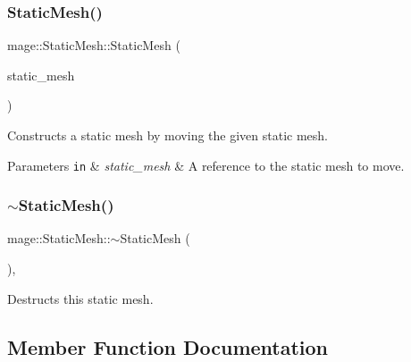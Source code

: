 \subsubsection{\texorpdfstring{Static\+Mesh()}{StaticMesh()}\hspace{0.1cm}{\footnotesize\ttfamily [4/4]}}
{\footnotesize\ttfamily mage\+::\+Static\+Mesh\+::\+Static\+Mesh (\begin{DoxyParamCaption}\item[{\hyperlink{classmage_1_1_static_mesh}{Static\+Mesh} \&\&}]{static\+\_\+mesh }\end{DoxyParamCaption})\hspace{0.3cm}{\ttfamily [default]}}

Constructs a static mesh by moving the given static mesh.


\begin{DoxyParams}[1]{Parameters}
\mbox{\tt in}  & {\em static\+\_\+mesh} & A reference to the static mesh to move. \\
\hline
\end{DoxyParams}
\hypertarget{classmage_1_1_static_mesh_a7fbae949f631d29913193a1b2c2ef658}{}\label{classmage_1_1_static_mesh_a7fbae949f631d29913193a1b2c2ef658} 
\subsubsection{\texorpdfstring{$\sim$\+Static\+Mesh()}{~StaticMesh()}}
{\footnotesize\ttfamily mage\+::\+Static\+Mesh\+::$\sim$\+Static\+Mesh (\begin{DoxyParamCaption}{ }\end{DoxyParamCaption})\hspace{0.3cm}{\ttfamily [virtual]}, {\ttfamily [default]}}

Destructs this static mesh. 

\subsection{Member Function Documentation}
\hypertarget{classmage_1_1_static_mesh_aaf793aaeccd66c2b1b172f2847db86ed}{}\label{classmage_1_1_static_mesh_aaf793aaeccd66c2b1b172f2847db86ed} 
